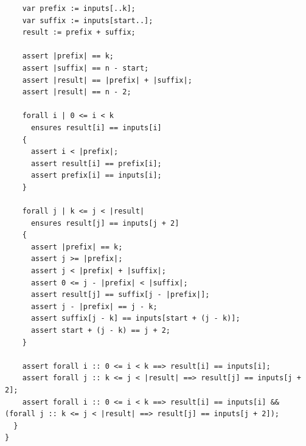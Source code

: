 \documentclass{article}
\begin{document}
\begin{lstlisting}
    var prefix := inputs[..k];
    var suffix := inputs[start..];
    result := prefix + suffix;

    assert |prefix| == k;
    assert |suffix| == n - start;
    assert |result| == |prefix| + |suffix|;
    assert |result| == n - 2;

    forall i | 0 <= i < k
      ensures result[i] == inputs[i]
    {
      assert i < |prefix|;
      assert result[i] == prefix[i];
      assert prefix[i] == inputs[i];
    }

    forall j | k <= j < |result|
      ensures result[j] == inputs[j + 2]
    {
      assert |prefix| == k;
      assert j >= |prefix|;
      assert j < |prefix| + |suffix|;
      assert 0 <= j - |prefix| < |suffix|;
      assert result[j] == suffix[j - |prefix|];
      assert j - |prefix| == j - k;
      assert suffix[j - k] == inputs[start + (j - k)];
      assert start + (j - k) == j + 2;
    }

    assert forall i :: 0 <= i < k ==> result[i] == inputs[i];
    assert forall j :: k <= j < |result| ==> result[j] == inputs[j + 2];
    assert forall i :: 0 <= i < k ==> result[i] == inputs[i] && (forall j :: k <= j < |result| ==> result[j] == inputs[j + 2]);
  }
}
\end{lstlisting}
\end{document}
